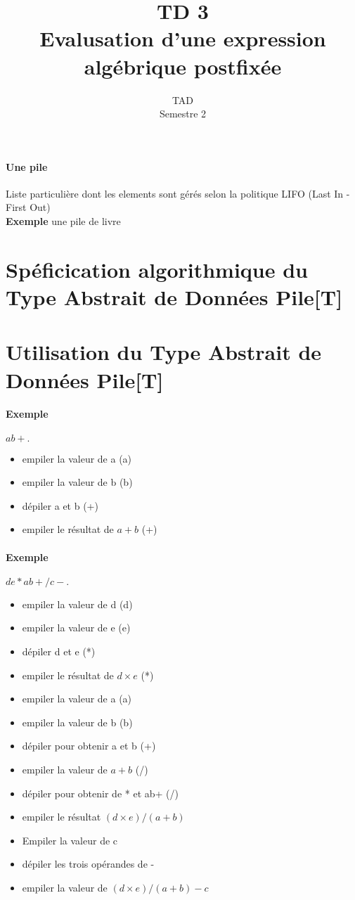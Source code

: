 \documentclass{article}
\title{TD 3\\ Evalusation d'une expression algébrique postfixée}
\date{TAD\\ Semestre 2}
\begin{document}
	\maketitle
	\paragraph{Une pile}
		Liste particulière dont les elements sont gérés selon la politique LIFO
			(Last In - First Out)\\
		\textbf{Exemple} une pile de livre
		
	\section{Spéficication algorithmique du Type Abstrait de Données Pile[T]}
		
	\section{Utilisation du Type Abstrait de Données Pile[T]}		
		\paragraph{Exemple} $a b + . $\\
		\begin{itemize}
			\item empiler la valeur de a (a)
			\item empiler la valeur de b (b)
			\item dépiler a et b (+)
			\item empiler le résultat de $a + b$ (+)
		\end{itemize}
		\paragraph{Exemple} $d e * a b + / c - . $\\
		\begin{itemize}
			\item empiler la valeur de d (d)
			\item empiler la valeur de e (e)
			\item dépiler d et e (*)
			\item empiler le résultat de $d \times e$ (*)
			\item empiler la valeur de a (a)
			\item empiler la valeur de b (b)
			\item dépiler pour obtenir a et b (+) 
			\item empiler la valeur de $a + b$ (/) 
			\item dépiler pour obtenir de * et ab+ (/)
			\item empiler le résultat $(d \times e) / (a + b)$
			\item Empiler la valeur de c
			\item dépiler les trois opérandes de -
			\item empiler la valeur de $(d \times e)/(a + b) - c$
		\end{itemize}
		
		
\end{document}
